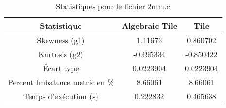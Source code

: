 \documentclass{article}
\begin{document}
\begin{table}[htbp]
  \centering
  \caption{Statistiques pour le fichier 2mm.c}
  \begin{tabular}{|c|c|c|}
    \hline
    Statistique & Algebraic Tile & Tile \\ 
    \hline
    Skewness (g1) & 1.11673 & 0.860702 \\ 
    Kurtosis (g2) & -0.695334 & -0.850422 \\ 
    Écart type & 0.0223904 & 0.0223904 \\ 
    Percent Imbalance metric en \% & 8.66061 & 8.66061 \\ 
    Temps d'exécution (s) &  0.222832 &  0.465638    \\ 
    \hline
  \end{tabular}
\end{table}
\newpage

  
\end{document}

